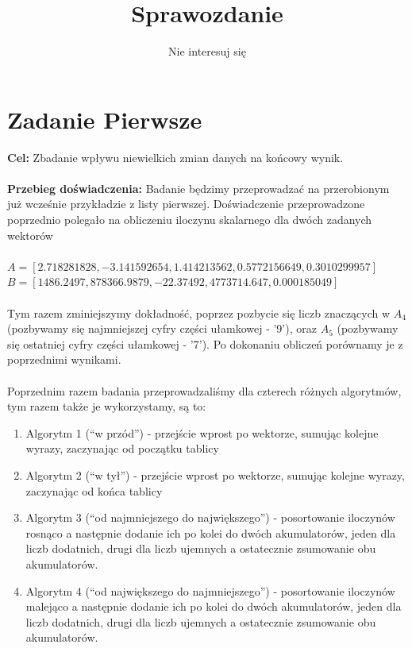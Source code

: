 \documentclass{article}
\author{Nie interesuj się}
\title{Sprawozdanie}
\begin{document}
\maketitle
\section*{Zadanie Pierwsze}
\noindent \textbf{Cel: } Zbadanie wpływu niewielkich zmian danych na końcowy wynik.\\\\
\noindent \textbf{Przebieg doświadczenia: } Badanie będzimy przeprowadzać na przerobionym już wcześnie przykładzie z listy pierwszej.  Doświadczenie przeprowadzone poprzednio polegało na obliczeniu iloczynu skalarnego dla dwóch zadanych wektorów \\\\
$A= [2.718281828, -3.141592654, 1.414213562, 0.5772156649, 0.3010299957]$ \\
$B= [1486.2497, 878366.9879, -22.37492, 4773714.647, 0.000185049]$\\\\
\noindent Tym razem zminiejszymy dokładność, poprzez pozbycie się liczb znaczących w $A_{4}$ (pozbywamy się najmniejszej cyfry części ułamkowej - '9'), oraz $A_{5}$ (pozbywamy się ostatniej cyfry części ułamkowej - '7'). Po dokonaniu obliczeń porównamy je z poprzednimi wynikami.\\\\
Poprzednim razem badania przeprowadzaliśmy dla czterech różnych algorytmów, tym razem także je wykorzystamy, są to:
\begin{enumerate}
	\item Algorytm 1 (``w przód'') - przejście wprost po wektorze, sumując kolejne wyrazy, zaczynając od początku tablicy
	\item Algorytm 2 (``w tył'') - przejście wprost po wektorze, sumując kolejne wyrazy, zaczynając od końca tablicy
	\item Algorytm 3 (``od najmniejszego do największego'') - posortowanie iloczynów rosnąco a następnie dodanie ich po kolei do dwóch akumulatorów, jeden dla liczb dodatnich, drugi dla liczb ujemnych a ostatecznie zsumowanie obu akumulatorów.
	\item Algorytm 4 (``od największego do najmniejszego'') - posortowanie iloczynów malejąco a następnie dodanie ich po kolei do dwóch akumulatorów, jeden dla liczb dodatnich, drugi dla liczb ujemnych a ostatecznie zsumowanie obu akumulatorów.\\\\
\end{enumerate}
\end{document}
